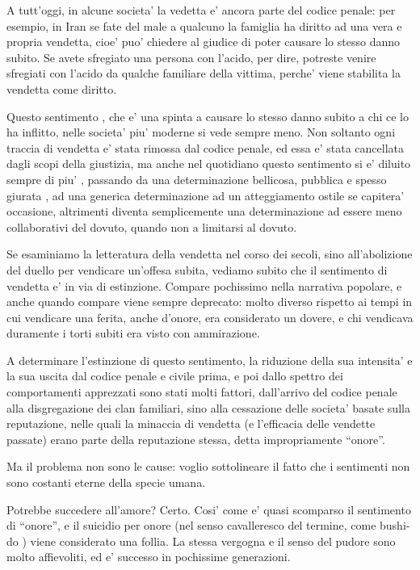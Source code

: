\documentclass[dvipsnames]{amsart}
\begin{document}
  A tutt’oggi, in alcune societa’ la vedetta e’ ancora parte del codice penale: per esempio, in Iran se fate del male a qualcuno la famiglia ha diritto ad una vera e propria vendetta, cioe’ puo’ chiedere al giudice di poter causare lo stesso danno subito. Se avete sfregiato una persona con l’acido, per dire, potreste venire sfregiati con l’acido da qualche familiare della vittima, perche’ viene stabilita la vendetta come diritto.
  
  Questo sentimento , che e’ una spinta a causare lo stesso danno subito a chi ce lo ha inflitto, nelle societa’ piu’ moderne si vede sempre meno. Non soltanto ogni traccia di vendetta e’ stata rimossa dal codice penale, ed essa e’ stata cancellata dagli scopi della giustizia, ma anche nel quotidiano questo sentimento si e’ diluito sempre di piu’ , passando da una determinazione bellicosa, pubblica e spesso giurata , ad una generica determinazione ad un atteggiamento ostile se capitera’ occasione, altrimenti diventa semplicemente una determinazione ad essere meno collaborativi del dovuto, quando non a limitarsi al dovuto.
  
  Se esaminiamo la letteratura della vendetta nel corso dei secoli, sino all’abolizione del duello per vendicare un’offesa subita, vediamo subito che il sentimento di vendetta e’ in via di estinzione. Compare pochissimo nella narrativa popolare, e anche quando compare viene sempre deprecato: molto diverso rispetto ai tempi in cui vendicare una ferita, anche d’onore, era considerato un dovere, e chi vendicava duramente i torti subiti era visto con ammirazione.
  
  A determinare l’estinzione di questo sentimento, la riduzione della sua intensita’ e la sua uscita dal codice penale e civile prima, e poi dallo spettro dei comportamenti apprezzati sono stati molti fattori, dall’arrivo del codice penale alla disgregazione dei clan familiari, sino alla cessazione delle societa’ basate sulla reputazione, nelle quali la minaccia di vendetta (e l’efficacia delle vendette passate) erano parte della reputazione stessa, detta impropriamente “onore”.
  
  Ma il problema non sono le cause: voglio sottolineare il fatto che i sentimenti non sono costanti eterne della specie umana.
  
  Potrebbe succedere all’amore? Certo. Cosi’ come e’ quasi scomparso il sentimento di “onore”, e il suicidio per onore (nel senso cavalleresco del termine, come bushi-do ) viene considerato una follia. La stessa vergogna e il senso del pudore sono molto affievoliti, ed e’ successo in pochissime generazioni.
  
\end{document}

